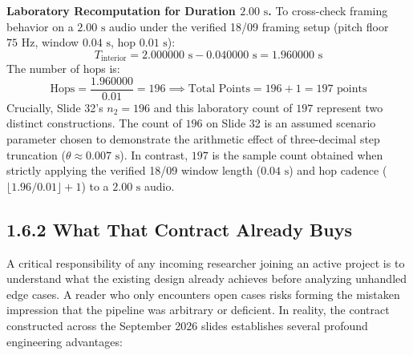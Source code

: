 \documentclass[11pt,a4paper]{article}
\begin{document}
\textbf{Laboratory Recomputation for Duration $2.00\text{ s}$.} To cross-check framing behavior on a $2.00\text{ s}$ audio under the verified 18/09 framing setup (pitch floor $75\text{ Hz}$, window $0.04\text{ s}$, hop $0.01\text{ s}$):
\begin{equation}
T_{\text{interior}} = 2.000000\text{ s} - 0.040000\text{ s} = 1.960000\text{ s}
\end{equation}
The number of hops is:
\begin{equation}
\text{Hops} = \frac{1.960000}{0.01} = 196 \implies \text{Total Points} = 196 + 1 = 197\text{ points}
\end{equation}
Crucially, Slide 32's $n_2 = 196$ and this laboratory count of $197$ represent two distinct constructions. The count of $196$ on Slide 32 is an assumed scenario parameter chosen to demonstrate the arithmetic effect of three-decimal step truncation ($\theta \approx 0.007\text{ s}$). In contrast, $197$ is the sample count obtained when strictly applying the verified 18/09 window length ($0.04\text{ s}$) and hop cadence ($\lfloor 1.96 / 0.01 \rfloor + 1$) to a $2.00\text{ s}$ audio.

\subsection*{1.6.2 What That Contract Already Buys}

A critical responsibility of any incoming researcher joining an active project is to understand what the existing design already achieves before analyzing unhandled edge cases. A reader who only encounters open cases risks forming the mistaken impression that the pipeline was arbitrary or deficient. In reality, the contract constructed across the September 2026 slides establishes several profound engineering advantages:
\end{document}
